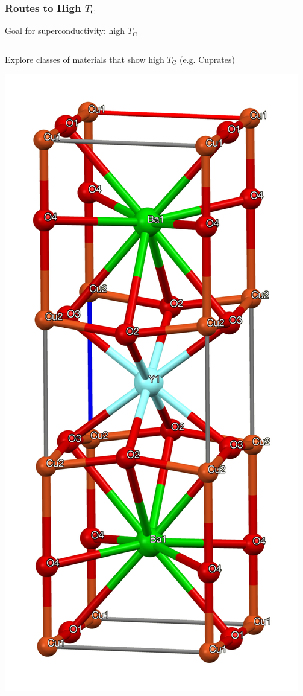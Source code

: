 \documentclass[aspectratio=169]{beamer}
\begin{document}
\begin{frame}
	\frametitle{Routes to High \(T_{\mathrm{C}}\)}
	
	Goal for superconductivity: high \(T_{\mathrm{C}}\)\pause
	\begin{columns}[T]
		\begin{column}{0.5\textwidth}
			\begin{center}
				Explore classes of materials that show high \(T_{\mathrm{C}}\) (e.g. Cuprates)
				
				\includegraphics[height=0.4\textheight]{figs/YBCO-xtal-unit-cell-3D-bs-17-atoms-labelled}
				

\end{center}
\end{column}
\end{columns}
\end{frame}
\end{document}

